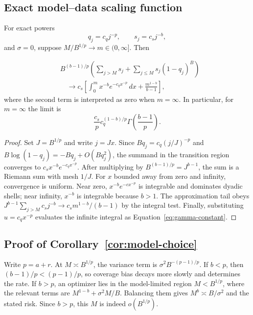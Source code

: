\subsection{Exact model--data scaling function}

For exact powers
\begin{equation}
q_j=c_qj^{-p},
\qquad
s_j=c_sj^{-b},
\label{eq:exact-powers}
\end{equation}
and $\sigma=0$, suppose
$M/B^{1/p}\to m\in(0,\infty]$. Then
\begin{theorem}
\label{thm:scaling-function}
\begin{align}
&B^{(b-1)/p}
\left(
\sum_{j>M}s_j+\sum_{j\le M}s_j(1-q_j)^B
\right)
\nonumber\\
&\quad\longrightarrow
c_s\left[
\int_0^m x^{-b}e^{-c_qx^{-p}}\,dx
+\frac{m^{1-b}}{b-1}
\right],
\label{eq:scaling-function}
\end{align}
where the second term is interpreted as zero when $m=\infty$. In particular,
for $m=\infty$ the limit is
\begin{equation}
\frac{c_s}{p}c_q^{(1-b)/p}
\Gamma\!\left(\frac{b-1}{p}\right).
\label{eq:gamma-constant}
\end{equation}
\end{theorem}

\begin{proof}
Set $J=B^{1/p}$ and write $j=Jx$. Since
$Bq_j=c_q(j/J)^{-p}$ and
$B\log(1-q_j)=-Bq_j+O(Bq_j^2)$, the summand in the transition region converges
to $c_sx^{-b}e^{-c_qx^{-p}}$. After multiplying by
$B^{(b-1)/p}=J^{b-1}$, the sum is a Riemann sum with mesh $1/J$.
For $x$ bounded away from zero and infinity, convergence is uniform. Near
zero, $x^{-b}e^{-c x^{-p}}$ is integrable and dominates dyadic shells; near
infinity, $x^{-b}$ is integrable because $b>1$. The approximation tail obeys
$J^{b-1}\sum_{j>M}c_sj^{-b}\to c_sm^{1-b}/(b-1)$ by the integral test.
Finally, substituting $u=c_qx^{-p}$ evaluates the infinite integral as
Equation~\eqref{eq:gamma-constant}.
\end{proof}

\subsection{Proof of Corollary~\ref{cor:model-choice}}

Write $p=a+r$. At $M\asymp B^{1/p}$, the variance term is
$\sigma^2B^{-(p-1)/p}$. If $b<p$, then
$(b-1)/p<(p-1)/p$, so coverage bias decays more slowly and determines the
rate. If $b>p$, an optimizer lies in the model-limited region $M<B^{1/p}$,
where the relevant terms are $M^{1-b}+\sigma^2M/B$. Balancing them gives
$M^b\asymp B/\sigma^2$ and the stated risk. Since $b>p$, this $M$ is indeed
$o(B^{1/p})$.

